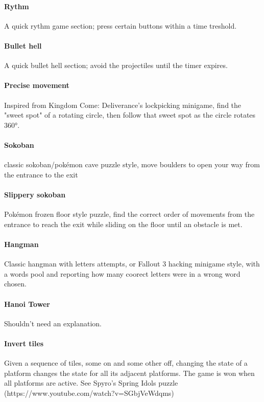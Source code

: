 \paragraph{Rythm} A quick rythm game section; press certain buttons within a time treshold.

\paragraph{Bullet hell} A quick bullet hell section; avoid the projectiles until the timer expires. 

\paragraph{Precise movement} Inspired from Kingdom Come: Deliverance's lockpicking minigame, find the "sweet spot" of a rotating circle, then follow that sweet spot as the circle rotates 360°.

\paragraph{Sokoban} classic sokoban/pokémon cave puzzle style, move boulders to open your way from the entrance to the exit

\paragraph{Slippery sokoban} Pokémon frozen floor style puzzle, find the correct order of movements from the entrance to reach the exit while sliding on the floor until an obstacle is met.

\paragraph{Hangman} Classic hangman with letters attempts, or Fallout 3 hacking minigame style, with a words pool and reporting how many coorect letters were in a wrong word chosen.

\paragraph{Hanoi Tower} Shouldn't need an explanation.

\paragraph{Invert tiles} Given a sequence of tiles, some on and some other off, changing the state of a platform changes the state for all its adjacent platforms. The game is won when all platforms are active. See Spyro's Spring Idols puzzle (https://www.youtube.com/watch?v=SGbjVeWdqms)

\pagebreak